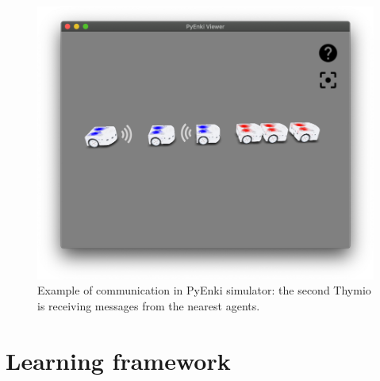 \begin{figure}[h!tb]
	\centering
	\includegraphics[width=.6\textwidth]{contents/images/thymio-comm}
	\caption{Example of communication in PyEnki simulator: the second 
		Thymio is 
		receiving messages from the nearest agents.}
	\label{fig:thymio comm}
\end{figure}



\section{Learning framework}
\label{sec:learning}

